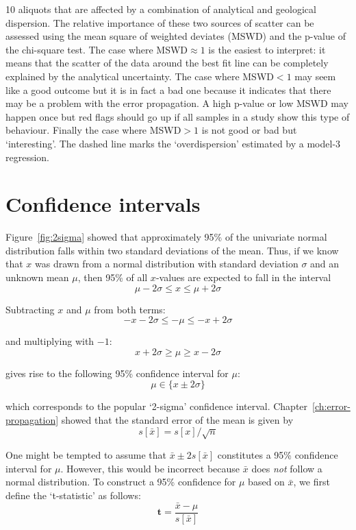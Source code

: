 \begin{refsection}
\begin{minipage}[t]{.6\textwidth}
{    10 aliquots that are affected by a combination of analytical and
    geological dispersion. The relative importance of these two
    sources of scatter can be assessed using the mean square of
    weighted deviates (MSWD) and the p-value of the chi-square
    test. The case where MSWD$\approx{1}$ is the easiest to interpret:
    it means that the scatter of the data around the best fit line can
    be completely explained by the analytical uncertainty. The case
    where MSWD$<{1}$ may seem like a good outcome but it is in fact a
    bad one because it indicates that there may be a problem with the
    error propagation. A high p-value or low MSWD may happen once but
    red flags should go up if all samples in a study show this type of
    behaviour. Finally the case where MSWD$>{1}$ is not good or bad
    but `interesting'. The dashed line marks the `overdispersion'
    estimated by a model-3 regression.}
  \label{fig:isochronMSWD}
\end{minipage}

\section{Confidence intervals}
\label{sec:CI}

Figure~\ref{fig:2sigma} showed that approximately 95\% of the
univariate normal distribution falls within two standard deviations of
the mean. Thus, if we know that $x$ was drawn from a normal
distribution with standard deviation $\sigma$ and an unknown mean
$\mu$, then 95\% of all $x$-values are expected to fall in the
interval
\[
\mu - 2\sigma \leq x \leq \mu + 2\sigma
\]

Subtracting $x$ and $\mu$ from both terms:
\[
-x - 2\sigma \leq -\mu \leq -x + 2\sigma
\]

\noindent and multiplying with $-1$:
\[
x + 2\sigma \geq \mu \geq x - 2\sigma
\]

\noindent gives rise to the following 95\% confidence interval for
$\mu$:
\[
\mu \in \{ x \pm 2\sigma \}
\]

\noindent which corresponds to the popular `2-sigma' confidence
interval.  Chapter~\ref{ch:error-propagation} showed that the standard
error of the mean is given by
\[
s[\bar{x}] = s[x]/\sqrt{n}
\]

One might be tempted to assume that $\bar{x} \pm 2 s[\bar{x}]$
constitutes a 95\% confidence interval for $\mu$. However, this would
be incorrect because $\bar{x}$ does \emph{not} follow a normal
distribution. To construct a 95\% confidence for $\mu$ based on
$\bar{x}$, we first define the `t-statistic' as follows:
\begin{equation}
  \mathbf{t} = \frac{\bar{x}-\mu}{s[\bar{x}]}
  \label{eq:tstat}
\end{equation}


\end{refsection}
